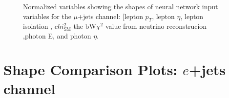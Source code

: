 \begin{figure}[h!]
\vspace{-4.5mm}
\hfil
{}
\caption{Normalized variables showing the shapes of neural network input variables for the $\mu$+jets channel: [lepton $p_T$, lepton $\eta$, lepton isolation , $chi^2_{\text{SM}}$ the bW$\chi^2$ value from neutrino reconstrucion ,photon E, and photon $\eta$.  }
\label{fig:VarPlots5}
\end{figure}

\section{Shape Comparison Plots: $e$+jets channel}

